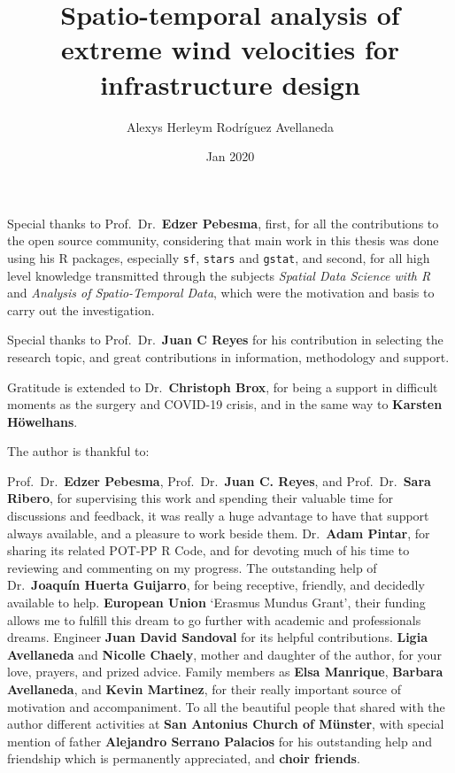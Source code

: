 \documentclass[12pt,twoside]{reedthesis}
\title{Spatio-temporal analysis of extreme wind velocities for infrastructure design}
\author{Alexys Herleym Rodríguez Avellaneda}
\date{Jan 2020}
\begin{document}
  \maketitle

\frontmatter %
\pagestyle{empty} %
  \begin{acknowledgements}
    Special thanks to Prof.~Dr.~\textbf{Edzer Pebesma}, first, for all the contributions to the open source community, considering that main work in this thesis was done using his R packages, especially \texttt{sf}, \texttt{stars} and \texttt{gstat}, and second, for all high level knowledge transmitted through the subjects \emph{Spatial Data Science with R} and \emph{Analysis of Spatio-Temporal Data}, which were the motivation and basis to carry out the investigation.
    
    \par
    
    Special thanks to Prof.~Dr.~\textbf{Juan C Reyes} for his contribution in selecting the research topic, and great contributions in information, methodology and support.
    
    \par
    
    Gratitude is extended to Dr.~\textbf{Christoph Brox}, for being a support in difficult moments as the surgery and COVID-19 crisis, and in the same way to \textbf{Karsten Höwelhans}.
    
    \par
    
    The author is thankful to:
    
    \par
    
    Prof.~Dr.~\textbf{Edzer Pebesma}, Prof.~Dr.~\textbf{Juan C. Reyes}, and Prof.~Dr.~\textbf{Sara Ribero}, for supervising this work and spending their valuable time for discussions and feedback, it was really a huge advantage to have that support always available, and a pleasure to work beside them. Dr.~\textbf{Adam Pintar}, for sharing its related POT-PP R Code, and for devoting much of his time to reviewing and commenting on my progress. The outstanding help of Dr.~\textbf{Joaquín Huerta Guijarro}, for being receptive, friendly, and decidedly available to help. \textbf{European Union} `Erasmus Mundus Grant', their funding allows me to fulfill this dream to go further with academic and professionals dreams. Engineer \textbf{Juan David Sandoval} for its helpful contributions. \textbf{Ligia Avellaneda} and \textbf{Nicolle Chaely}, mother and daughter of the author, for your love, prayers, and prized advice. Family members as \textbf{Elsa Manrique}, \textbf{Barbara Avellaneda}, and \textbf{Kevin Martinez}, for their really important source of motivation and accompaniment. To all the beautiful people that shared with the author different activities at \textbf{San Antonius Church of Münster}, with special mention of father \textbf{Alejandro Serrano Palacios} for his outstanding help and friendship which is permanently appreciated, and \textbf{choir friends}.
  \end{acknowledgements}
\end{document}
